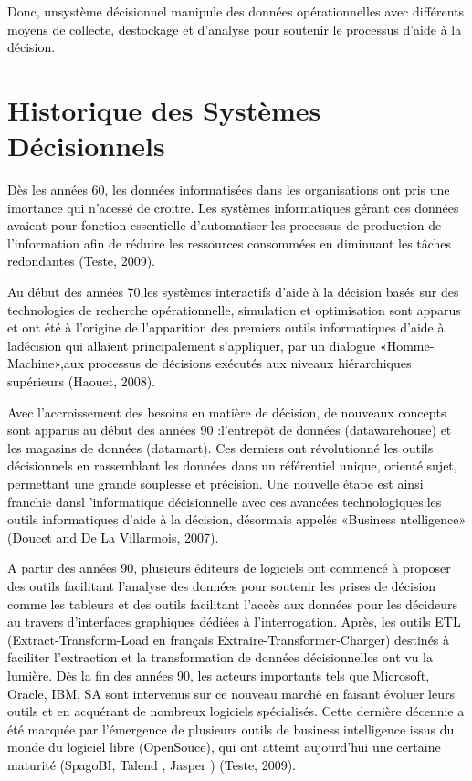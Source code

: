 \documentclass[a4paper,12pt]{report}
\begin{document}
\textcolor{black}{Donc, unsystème décisionnel manipule des données opérationnelles avec différents moyens de collecte, destockage et d’analyse pour soutenir le processus d’aide à la décision.}

\section{Historique des Systèmes Décisionnels}
\textcolor{black}{Dès les années 60, les données informatisées dans les organisations ont pris une imortance qui n’acessé de croitre. Les systèmes informatiques gérant ces données avaient pour fonction essentielle d’automatiser les processus de production de l’information afin de réduire les ressources consommées en diminuant les tâches redondantes  (Teste, 2009).}

\textcolor{black}{Au début des années 70,les systèmes interactifs d’aide à la décision basés sur des technologies de recherche opérationnelle, simulation et optimisation sont apparus et ont été à l’origine de l’apparition des premiers outils informatiques d’aide à ladécision qui allaient principalement s’appliquer, par un dialogue «Homme-Machine»,aux processus de décisions exécutés aux niveaux hiérarchiques supérieurs (Haouet, 2008).

Avec l’accroissement des besoins en matière de décision, de nouveaux concepts sont apparus au début des années 90 :l’entrepôt de données (datawarehouse) et les magasins de données (datamart). Ces derniers ont révolutionné les outils décisionnels en rassemblant les données dans un référentiel unique, orienté sujet, permettant une grande souplesse et précision.
Une nouvelle étape est ainsi franchie dansl ’informatique décisionnelle avec ces avancées technologiques:les outils informatiques d’aide à la décision, désormais appelés «Business ntelligence» (Doucet and De La Villarmois, 2007).}

\textcolor{black}{A partir des années 90, plusieurs éditeurs de logiciels ont commencé à proposer des outils facilitant l’analyse des données pour soutenir les prises de décision comme les tableurs et des outils facilitant l’accès aux données pour les décideurs au travers d’interfaces
graphiques dédiées à l’interrogation. Après, les outils ETL (Extract-Transform-Load en
français Extraire-Transformer-Charger) destinés à faciliter l’extraction et la transformation de données décisionnelles ont vu la lumière. Dès la fin des années 90, les acteurs importants tels que Microsoft, Oracle, IBM, SA sont intervenus sur ce nouveau
marché en faisant évoluer leurs outils et en acquérant de nombreux logiciels spécialisés.
Cette dernière décennie a été marquée par l’émergence de plusieurs outils de business intelligence issus du monde du logiciel libre (OpenSouce), qui ont atteint aujourd’hui une certaine maturité (SpagoBI, Talend , Jasper ) (Teste, 2009).}
\end{document}
